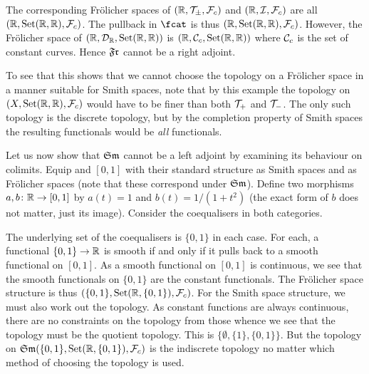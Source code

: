 \documentclass[%
12pt,%
arxiv,%
defaults
]{myclass}
\begin{document}
The corresponding Fr\"olicher spaces of
 \((\mathbb{R}, \mathcal{T}_\pm, \mathcal{F}_c)\)
and \((\mathbb{R}, \mathcal{I}, \mathcal{F}_c)\)
are all
 \((\mathbb{R}, \operatorname{Set}(\mathbb{R},\mathbb{R}), \mathcal{F}_c)\).
The pullback in \(\fcat\) is thus
 \((\mathbb{R}, \operatorname{Set}(\mathbb{R},\mathbb{R}), \mathcal{F}_c)\).
However, the Fr\"olicher space of \((\mathbb{R}, \mathcal{D}_{\mathbb{R}}, \operatorname{Set}(\mathbb{R},\mathbb{R}))\) is
 \((\mathbb{R}, \mathcal{C}_c, \operatorname{Set}(\mathbb{R},\mathbb{R}))\)
where \(\mathcal{C}_c\) is the set of constant curves.
Hence \(\SmFr\) cannot be a right adjoint.

To see that this shows that we cannot choose the topology on a Fr\"olicher space in a manner suitable for Smith spaces, note that by this example the topology on \((X, \operatorname{Set}(\mathbb{R},\mathbb{R}), \mathcal{F}_c)\) would have to be finer than both \(\mathcal{T}_+\) and \(\mathcal{T}_-\).
The only such topology is the discrete topology, but by the completion property of Smith spaces the resulting functionals would be \emph{all} functionals.

\medskip

Let us now show that \(\FrSm\) cannot be a left adjoint by examining its behaviour on colimits.
Equip \R and \([0,1]\) with their standard structure as Smith spaces and as Fr\"olicher spaces (note that these correspond under \(\FrSm\)).
Define two morphisms \(a, b \colon \mathbb{R} \to [0,1]\) by \(a(t) = 1\) and \(b(t) = 1/(1 + t^2)\) (the exact form of \(b\) does not matter, just its image).
Consider the coequalisers in both categories.

The underlying set of the coequalisers is \(\{0,1\}\) in each case.
For each, a functional \(\{0,1\} \to \mathbb{R}\) is smooth if and only if it pulls back to a smooth functional on \([0,1]\).
As a smooth functional on \([0,1]\) is continuous, we see that the smooth functionals on \(\{0,1\}\) are the constant functionals.
The Fr\"olicher space structure is thus \((\{0,1\}, \operatorname{Set}(\mathbb{R}, \{0,1\}), \mathcal{F}_c)\).
For the Smith space structure, we must also work out the topology.
As constant functions are always continuous, there are no constraints on the topology from those whence we see that the topology must be the quotient topology.
This is \(\{\emptyset, \{1\}, \{0,1\}\}\).
But the topology on \(\FrSm(\{0,1\}, \Set(\R, \{0,1\}), \m{F}_c)\) is the indiscrete topology no matter which method of choosing the topology is used.

\medskip
\end{document}
